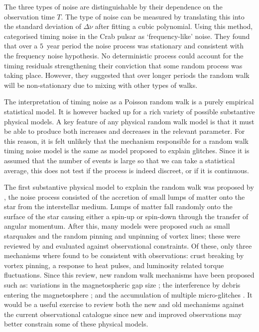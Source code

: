 The three types of noise are distinguishable by their dependence on the
observation time $T$. The type of noise can be measured by translating this
into the standard deviation of $\Delta\ddot{\nu}$ after fitting a cubic polynomial.
Using this method, \citet{Boynton1972} categorised timing noise in
the Crab pulsar as `frequency-like' noise.  They found that over a $5$~year
period the noise process was stationary and consistent with the frequency noise
hypothesis. No deterministic process could account for the timing residuals
strengthening their conviction that some random process was taking place.
However, they suggested that over longer periods the random walk will be
non-stationary due to mixing with other types of walks.

The interpretation of timing noise as a Poisson random walk is a purely
empirical statistical model. It is however backed up for a rich variety of
possible substantive physical models.  A key feature of any physical random
walk model is that it must be able to produce both increases and decreases in
the relevant parameter. For this reason, it is felt unlikely that the mechanism
responsible for a random walk timing noise model is the same as model proposed
to explain glitches. Since it is assumed that the number of events
is large so that we can take a statistical average, this does not test if the
process is indeed discreet, or if it is continuous.

The first substantive physical model to explain the random walk was proposed by
\citet{Boynton1972}, the noise process consisted of the accretion of small
lumps of matter onto the star from the interstellar medium. Lumps of matter fall
randomly onto the surface of the star causing either a spin-up or spin-down
through the transfer of angular momentum. After this, many models were proposed
such as small starquakes and the random pinning and unpinning of vortex lines; these
were reviewed by \citet{Cordes1981} and evaluated against observational
constraints. Of these, only three mechanisms where found to be consistent with
observations: crust breaking by vortex pinning, a response to heat pulses, and
luminosity related torque fluctuations. Since this review, new random walk
mechanisms have been proposed such as: variations in the magnetospheric gap
size \citep{Cheng1987}; the interference by debris entering the magnetosphere
\citep{Cordes2008}; and the accumulation of multiple micro-glitches
\citep{Janssen2006}. It would be a useful exercise to review both the new and
old mechanisms against the current observational catalogue since new and
improved observations may better constrain some of these physical models.

